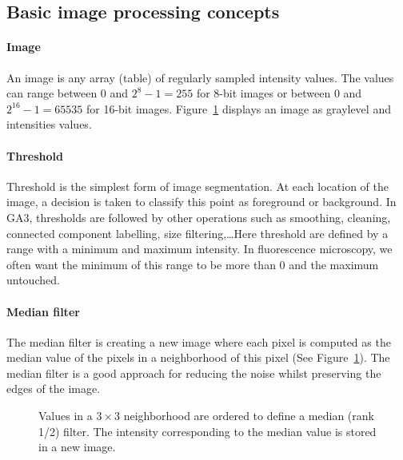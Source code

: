 \subsection{Basic image processing concepts}

\paragraph{Image} An image is any array (table) of regularly sampled intensity values. The values can range between $0$ and $2^8 - 1 = 255$ for 8-bit images or between $0$ and $2^{16} - 1 = 65535$ for 16-bit images. Figure~\ref{fig:median} displays an image as graylevel and intensities values.

\paragraph{Threshold} Threshold is the simplest form of image segmentation. At each location of the image, a decision is taken to classify this point as foreground or background. In GA3, thresholds are followed by other operations such as smoothing, cleaning, connected component labelling, size filtering,\dots Here threshold are defined by a range with a minimum and maximum intensity. In fluorescence microscopy, we often want the minimum of this range to be more than 0 and the maximum untouched.

\paragraph{Median filter} The median filter is creating a new image where each pixel is computed as the median value of the pixels in a neighborhood of this pixel (See Figure~\ref{fig:median}). The median filter is a good approach for reducing the noise whilst preserving the edges of the image.

\begin{figure}[ht]\centering
  \caption{Values in a $3 \times 3$ neighborhood are ordered to define a median (rank 1/2)
    filter. The intensity corresponding to the median value is stored in a new image.}
  \label{fig:median}
\end{figure}

